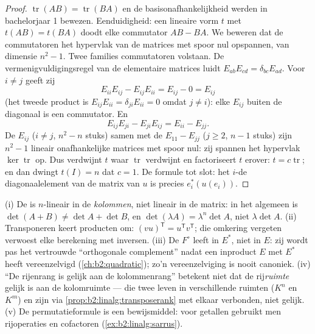 \begin{proof}
$\operatorname{tr}(AB) = \operatorname{tr}(BA)$ en de
basisonafhankelijkheid werden in bachelorjaar 1 bewezen.
Eenduidigheid: een lineaire vorm $t$ met $t(AB) = t(BA)$ doodt
elke commutator $AB - BA$. We beweren dat de commutatoren het
hypervlak van de matrices met spoor nul opspannen, van dimensie
$n^2 - 1$. Twee families commutatoren volstaan. De
vermenigvuldigingsregel van de elementaire matrices luidt
$E_{ab}E_{cd} = \delta_{bc}E_{ad}$. Voor $i \neq j$ geeft zij
\[
E_{ii}E_{ij} - E_{ij}E_{ii} = E_{ij} - 0 = E_{ij}
\]
(het tweede product is $E_{ij}E_{ii} = \delta_{ji}E_{ii} = 0$
omdat $j \neq i$): elke $E_{ij}$ buiten de diagonaal is een
commutator. En
\[
E_{ij}E_{ji} - E_{ji}E_{ij} = E_{ii} - E_{jj} .
\]
De $E_{ij}$ ($i \neq j$, $n^2 - n$ stuks) samen met de $E_{11} -
E_{jj}$ ($j \geq 2$, $n - 1$ stuks) zijn $n^2 - 1$ lineair
onafhankelijke matrices met spoor nul: zij spannen het hypervlak
$\ker\operatorname{tr}$ op. Dus verdwijnt $t$ waar
$\operatorname{tr}$ verdwijnt en factoriseert $t$ erover: $t =
c\operatorname{tr}$; en dan dwingt $t(I) = n$ dat $c = 1$. De
formule tot slot: het $i$-de diagonaalelement van de matrix van
$u$ is precies $e_i^*(u(e_i))$.
\end{proof}

\begin{remark}\label{rem:b2:linalg:pitfalls}
(i) De  is $n$-lineair in de \emph{kolommen}, niet
lineair in de matrix: in het algemeen is $\det(A + B) \neq \det A
+ \det B$, en $\det(\lambda A) = \lambda^n\det A$, niet
$\lambda\det A$. (ii) Transponeren keert producten om:
$(vu)^{\mathsf T} = u^{\mathsf T}v^{\mathsf T}$; die omkering
vergeten verwoest elke berekening met inversen. (iii) De
 $F^\circ$ leeft in $E^*$, niet in $E$: zij wordt pas
het vertrouwde ``orthogonale complement'' nadat een inproduct $E$
met $E^*$ heeft vereenzelvigd (\cref{ch:b2:quadratic}); zo'n
vereenzelviging is nooit canoniek. (iv) ``De rijenrang is gelijk
aan de kolommenrang'' betekent niet dat de rij\emph{ruimte} gelijk
is aan de kolomruimte --- die twee leven in verschillende ruimten
($K^n$ en $K^m$) en zijn via
\cref{prop:b2:linalg:transposerank} met elkaar verbonden, niet
gelijk. (v) De permutatieformule is een bewijsmiddel: voor
getallen gebruikt men rijoperaties en cofactoren
(\cref{ex:b2:linalg:sarrus}).
\end{remark}

